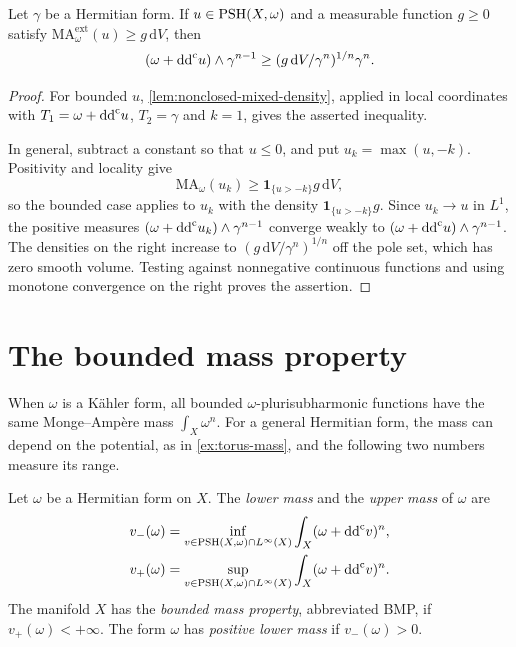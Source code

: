 \begin{lemma}\label{lem:unbounded-gauduchon-trace-density}
Let $\gamma$ be a Hermitian form. If $u\in\mathrm{PSH}(X,\omega)$ and a measurable function $g\geq0$ satisfy $\mathrm{MA}^{\mathrm{ext}}_\omega(u)\geq g\,\mathrm{d}V$, then
\[
 (\omega+\mathrm{dd}^{\mathrm{c}} u)\wedge\gamma^{n-1}
 \geq(g\,\mathrm{d}V/\gamma^n)^{1/n}\gamma^n.
\]
\end{lemma}
\begin{proof}
For bounded $u$, \cref{lem:nonclosed-mixed-density}, applied in local coordinates with $T_1=\omega+\mathrm{dd}^{\mathrm{c}} u$, $T_2=\gamma$ and $k=1$, gives the asserted inequality.

In general, subtract a constant so that $u\leq0$, and put $u_k=\max(u,-k)$. Positivity and locality give
\[
 \mathrm{MA}_\omega(u_k)\geq\mathbf1_{\{u>-k\}}g\,\mathrm{d}V,
\]
so the bounded case applies to $u_k$ with the density $\mathbf1_{\{u>-k\}}g$. Since $u_k\to u$ in $L^1$, the positive measures $(\omega+\mathrm{dd}^{\mathrm{c}} u_k)\wedge\gamma^{n-1}$ converge weakly to $(\omega+\mathrm{dd}^{\mathrm{c}} u)\wedge\gamma^{n-1}$. The densities on the right increase to $(g\,\mathrm{d}V/\gamma^n)^{1/n}$ off the pole set, which has zero smooth volume. Testing against nonnegative continuous functions and using monotone convergence on the right proves the assertion.
\end{proof}

\section{The bounded mass property}

When $\omega$ is a K\"ahler form, all bounded $\omega$-plurisubharmonic functions have the same Monge--Amp\`ere mass $\int_X\omega^n$. For a general Hermitian form, the mass can depend on the potential, as in \cref{ex:torus-mass}, and the following two numbers measure its range.

\begin{definition}\label{def:bmp}
Let $\omega$ be a Hermitian form on $X$. The \emph{lower mass} and the \emph{upper mass} of $\omega$ are
\[
 \begin{split}
 v_-(\omega)&=
 \inf_{v\in\mathrm{PSH}(X,\omega)\cap L^\infty(X)}
       \int_X(\omega+\mathrm{dd}^{\mathrm{c}} v)^n,\\
 v_+(\omega)&=
 \sup_{v\in\mathrm{PSH}(X,\omega)\cap L^\infty(X)}
       \int_X(\omega+\mathrm{dd}^{\mathrm{c}} v)^n.
 \end{split}
\]
The manifold $X$ has the \emph{bounded mass property}, abbreviated BMP, if $v_+(\omega)<+\infty$. The form $\omega$ has \emph{positive lower mass} if $v_-(\omega)>0$.
\end{definition}

